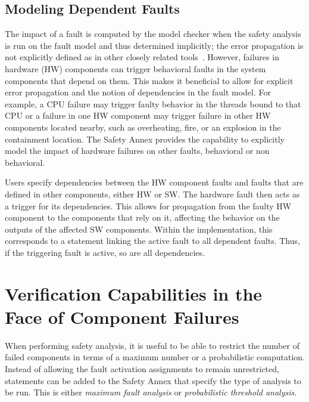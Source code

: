 \subsection{Modeling Dependent Faults}
The impact of a fault is computed by the \agree model checker when the safety analysis is run on the fault model and thus determined implicitly; the error propagation is not explicitly defined as in other closely related tools~\cite{EMV2,compass30toolset}. However, failures in hardware (HW) components can trigger behavioral faults in the system components that depend on them. This makes it beneficial to allow for explicit error propagation and the notion of dependencies in the fault model. For example, a CPU failure may trigger faulty behavior in the threads bound to that CPU or a failure in one HW component may trigger failure in other HW components located nearby, such as overheating, fire, or an explosion in the containment location. The Safety Annex provides the capability to explicitly model the impact of hardware failures on other faults, behavioral or non behavioral. 

Users specify dependencies between the HW component faults and faults that are defined in other components, either HW or SW. The hardware fault then acts as a trigger for its dependencies. This allows for propagation from the faulty HW component to the components that rely on it, affecting the behavior on the outputs of the affected SW components. Within the \lustre implementation, this corresponds to a statement linking the active fault to all dependent faults. Thus, if the triggering fault is active, so are all dependencies.

\section{Verification Capabilities in the Face of Component Failures}
When performing safety analysis, it is useful to be able to restrict the number of failed components in terms of a maximum number or a probabilistic computation. Instead of allowing the \lustre fault activation assignments to remain unrestricted, statements can be added to the Safety Annex that specify the type of analysis to be run. This is either \textit{maximum fault analysis} or \textit{probabilistic threshold analysis}. 

